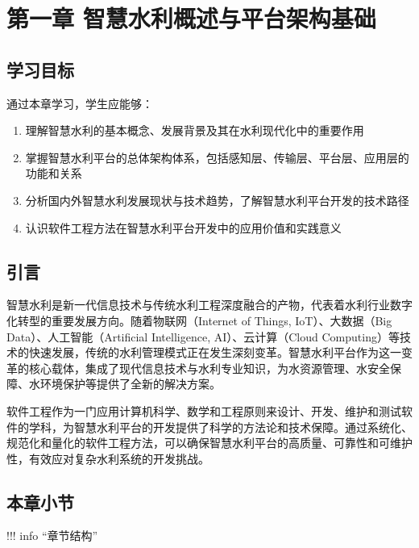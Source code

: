 \section{第一章 智慧水利概述与平台架构基础}\label{ux7b2cux4e00ux7ae0-ux667aux6167ux6c34ux5229ux6982ux8ff0ux4e0eux5e73ux53f0ux67b6ux6784ux57faux7840}

\subsection{学习目标}\label{ux5b66ux4e60ux76eeux6807}

通过本章学习，学生应能够：

\begin{enumerate}
\def\labelenumi{\arabic{enumi}.}
\tightlist
\item
  理解智慧水利的基本概念、发展背景及其在水利现代化中的重要作用
\item
  掌握智慧水利平台的总体架构体系，包括感知层、传输层、平台层、应用层的功能和关系
\item
  分析国内外智慧水利发展现状与技术趋势，了解智慧水利平台开发的技术路径
\item
  认识软件工程方法在智慧水利平台开发中的应用价值和实践意义
\end{enumerate}

\subsection{引言}\label{ux5f15ux8a00}

智慧水利是新一代信息技术与传统水利工程深度融合的产物，代表着水利行业数字化转型的重要发展方向。随着物联网（Internet of Things, IoT）、大数据（Big Data）、人工智能（Artificial Intelligence, AI）、云计算（Cloud Computing）等技术的快速发展，传统的水利管理模式正在发生深刻变革。智慧水利平台作为这一变革的核心载体，集成了现代信息技术与水利专业知识，为水资源管理、水安全保障、水环境保护等提供了全新的解决方案。

软件工程作为一门应用计算机科学、数学和工程原则来设计、开发、维护和测试软件的学科，为智慧水利平台的开发提供了科学的方法论和技术保障。通过系统化、规范化和量化的软件工程方法，可以确保智慧水利平台的高质量、可靠性和可维护性，有效应对复杂水利系统的开发挑战。

\subsection{本章小节}\label{ux672cux7ae0ux5c0fux8282}

!!! info ``章节结构''

